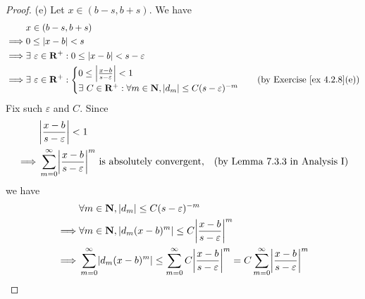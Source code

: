 \begin{proof}{(e)}
    Let \(x \in (b - s, b + s)\).
    We have
    \begin{align*}
                 & x \in (b - s, b + s)                                                                                           \\
        \implies & 0 \leq \left\lvert x - b\right\rvert < s                                                                                         \\
        \implies & \exists\ \varepsilon \in \mathbf{R}^+ : 0 \leq \left\lvert x - b\right\rvert < s - \varepsilon                                           \\
        \implies & \exists\ \varepsilon \in \mathbf{R}^+ : \begin{cases}
                                                       0 \leq \left\lvert\frac{x - b}{s - \varepsilon}\right\rvert < 1 \\
                                                       \exists\ C \in \mathbf{R}^+ : \forall m \in \mathbf{N}, \left\lvert d_m\right\rvert \leq C (s - \varepsilon)^{-m}
                                                   \end{cases} & \text{(by Exercise \ref{ex 4.2.8}(e))}
    \end{align*}
    Fix such \(\varepsilon\) and \(C\).
    Since
    \begin{align*}
                 & \abs{\frac{x - b}{s - \varepsilon}} < 1                                                                                             \\
        \implies & \sum_{m = 0}^\infty \abs{\frac{x - b}{s - \varepsilon}}^m \text{ is absolutely convergent}, & \text{(by Lemma 7.3.3 in Analysis I)}
    \end{align*}
    we have
    \begin{align*}
                 & \forall m \in \N, \abs{d_m} \leq C (s - \varepsilon)^{-m}                                                                                                                                                \\
        \implies & \forall m \in \N, \abs{d_m (x - b)^m} \leq C \abs{\frac{x - b}{s - \varepsilon}}^{m}                                                                                                                     \\
        \implies & \sum_{m = 0}^\infty \abs{d_m (x - b)^m} \leq \sum_{m = 0}^\infty C \abs{\frac{x - b}{s - \varepsilon}}^{m} = C \sum_{m = 0}^\infty \abs{\frac{x - b}{s - \varepsilon}}^{m}                               \\

\end{align*}
\end{proof}
